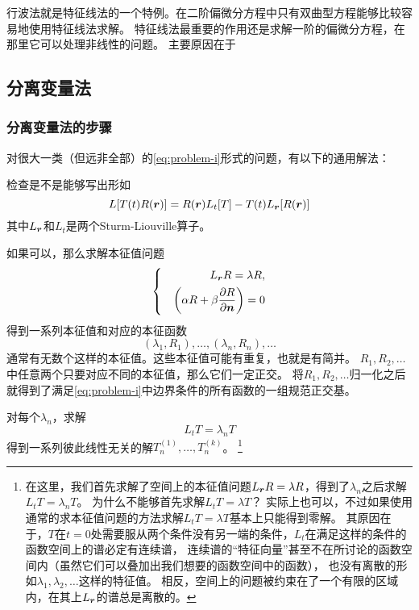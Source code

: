 \documentclass[UTF8]{ctexart}
\newenvironment{bigcase}{\left\{ \quad \begin{aligned}}{\end{aligned}\right.}
\renewenvironment{enumerate}{\begin{compactenum}}{\end{compactenum}}
\begin{document}
行波法就是特征线法的一个特例。在二阶偏微分方程中只有双曲型方程能够比较容易地使用特征线法求解。
特征线法最重要的作用还是求解一阶的偏微分方程，在那里它可以处理非线性的问题。
主要原因在于

\subsection{分离变量法}\label{sec:separation-of-variables}

\subsubsection{分离变量法的步骤}\label{sec:separation-of-variables-steps}

对很大一类（但远非全部）的\eqref{eq:problem-i}形式的问题，有以下的通用解法：
\begin{enumerate}
    \item 检查是不是能够写出形如
    \[
        L[T(t)R(\vb*{r})] = R(\vb*{r}) L_t [T] - T(t) L_{\vb*{r}} [R(\vb*{r})]
    \]
    其中$L_{\vb*{r}}$和$L_t$是两个Sturm-Liouville算子。
    \item 如果可以，那么求解本征值问题
    \[
        \begin{bigcase}
            L_{\vb*{r}} R = \lambda R, \\
            \left( \alpha R + \beta \pdv{R}{\vb*{n}} \right) = 0
        \end{bigcase}
    \]
    得到一系列本征值和对应的本征函数
    \[
        (\lambda_1, R_1), \ldots, (\lambda_n, R_n), \ldots
    \]
    通常有无数个这样的本征值。这些本征值可能有重复，也就是有简并。
    $R_1, R_2, \ldots$中任意两个只要对应不同的本征值，那么它们一定正交。
    将$R_1, R_2, \ldots$归一化之后就得到了满足\eqref{eq:problem-i}中边界条件的所有函数的一组规范正交基。
    \item 对每个$\lambda_n$，求解
    \[
        L_t T = \lambda_n T
    \]
    得到一系列彼此线性无关的解$T_n^{(1)}, \ldots, T_n^{(k)}$。%
    \footnote{在这里，我们首先求解了空间上的本征值问题$L_{\vb*{r}} R = \lambda R$，得到了$\lambda_n$之后求解$L_t T = \lambda_n T$。
    为什么不能够首先求解$L_t T = \lambda T$？
    实际上也可以，不过如果使用通常的求本征值问题的方法求解$L_t T = \lambda T$基本上只能得到零解。
    其原因在于，$T$在$t=0$处需要服从两个条件没有另一端的条件，$L_t$在满足这样的条件的函数空间上的谱必定有连续谱，
    连续谱的“特征向量”甚至不在所讨论的函数空间内（虽然它们可以叠加出我们想要的函数空间中的函数），
    也没有离散的形如$\lambda_1, \lambda_2, \ldots$这样的特征值。
    相反，空间上的问题被约束在了一个有限的区域内，在其上$L_{\vb*{r}}$的谱总是离散的。
}
\end{enumerate}
\end{document}
